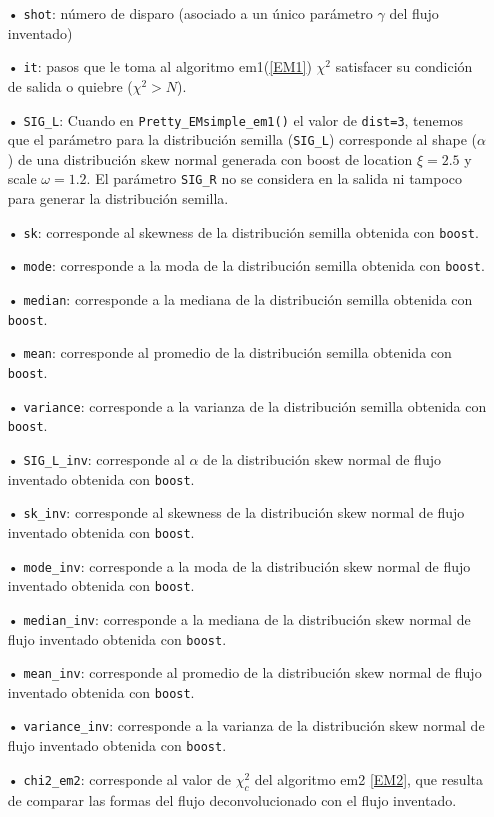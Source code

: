 \documentclass[11pt,letterpaper]{article}
\begin{document}
\begin{itemize}
\item[•] \verb|shot|: número de disparo (asociado a un único parámetro $\gamma$ del flujo inventado)
\item[•] \verb|it|: pasos que le toma al algoritmo em1(\ref{EM1}) $\chi^2$ satisfacer su condición de salida o quiebre ($\chi^2>N$). 
\item[•] \verb|SIG_L|: Cuando en  \verb|Pretty_EMsimple_em1()| el valor de \verb|dist=3|, tenemos que el parámetro para la distribución semilla (\verb|SIG_L|) corresponde al shape ($\alpha$) de una distribución skew normal generada con boost de location $\xi=2.5$ y scale $\omega=1.2$. El parámetro \verb|SIG_R| no se considera en la salida ni tampoco para generar la distribución semilla.
\item[•] \verb|sk|: corresponde al skewness de la distribución semilla obtenida con \verb|boost|.
\item[•] \verb|mode|: corresponde a la moda de la distribución semilla obtenida con \verb|boost|.
\item[•] \verb|median|: corresponde a la mediana de la distribución semilla obtenida con \verb|boost|.
\item[•] \verb|mean|: corresponde al promedio de la distribución semilla obtenida con \verb|boost|.
\item[•] \verb|variance|: corresponde a la varianza de la distribución semilla obtenida con \verb|boost|.


\item[•] \verb|SIG_L_inv|: corresponde al $\alpha$ de la distribución skew normal de flujo inventado obtenida con \verb|boost|.
\item[•] \verb|sk_inv|: corresponde al skewness de la distribución skew normal de flujo inventado obtenida con \verb|boost|.
\item[•] \verb|mode_inv|: corresponde a la moda de la distribución skew normal de flujo inventado obtenida con \verb|boost|.
\item[•] \verb|median_inv|: corresponde a la mediana de la distribución skew normal de flujo inventado obtenida con \verb|boost|.
\item[•] \verb|mean_inv|: corresponde al promedio de la distribución skew normal de flujo inventado obtenida con \verb|boost|.
\item[•] \verb|variance_inv|: corresponde a la varianza de la distribución skew normal de flujo inventado obtenida con \verb|boost|.

\item[•] \verb|chi2_em2|: corresponde al valor de $\chi^2_c$ del algoritmo em2 \ref{EM2}, que resulta de comparar las formas del flujo deconvolucionado con el flujo inventado.
\end{itemize}
\end{document}

